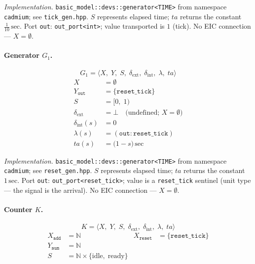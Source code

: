 \noindent\textit{Implementation.}
\texttt{basic\_model::devs::generator<TIME>}
from namespace \texttt{cadmium}; see \texttt{tick\_gen.hpp}.
$S$ represents elapsed time; $ta$ returns the constant
$\tfrac{1}{10}\,\text{sec}$.
Port \texttt{out}: \texttt{out\_port<int>}; value transported is $1$ (tick).
No EIC connection --- $X = \emptyset$.

\paragraph{Generator $G_1$.}

\[
  G_1 = \langle X,\; Y,\; S,\;
          \delta_{\text{ext}},\; \delta_{\text{int}},\;
          \lambda,\; ta \rangle
\]
\begin{align*}
  X &= \emptyset \\
  Y_{\texttt{out}} &= \{\texttt{reset\_tick}\} \\
  S &= \bigl[0,\; 1\bigr) \\
  \delta_{\text{ext}} &= \bot
    \quad\text{(undefined; } X = \emptyset\text{)} \\
  \delta_{\text{int}}(s) &= 0 \\
  \lambda(s) &= (\texttt{out}: \texttt{reset\_tick}) \\
  ta(s) &= \bigl(1 - s\bigr)\,\text{sec}
\end{align*}

\noindent\textit{Implementation.}
\texttt{basic\_model::devs::generator<TIME>}
from namespace \texttt{cadmium}; see \texttt{reset\_gen.hpp}.
$S$ represents elapsed time; $ta$ returns the constant $1\,\text{sec}$.
Port \texttt{out}: \texttt{out\_port<reset\_tick>}; value is a
\texttt{reset\_tick} sentinel (unit type --- the signal is the arrival).
No EIC connection --- $X = \emptyset$.

\paragraph{Counter $K$.}

\[
  K = \langle X,\; Y,\; S,\;
       \delta_{\text{ext}},\; \delta_{\text{int}},\;
       \lambda,\; ta \rangle
\]
\begin{align*}
  X_{\texttt{add}}   &= \mathbb{N}
    & X_{\texttt{reset}} &= \{\texttt{reset\_tick}\} \\
  Y_{\texttt{sum}}   &= \mathbb{N} \\
  S &= \mathbb{N} \times \{\text{idle},\; \text{ready}\}
\end{align*}

